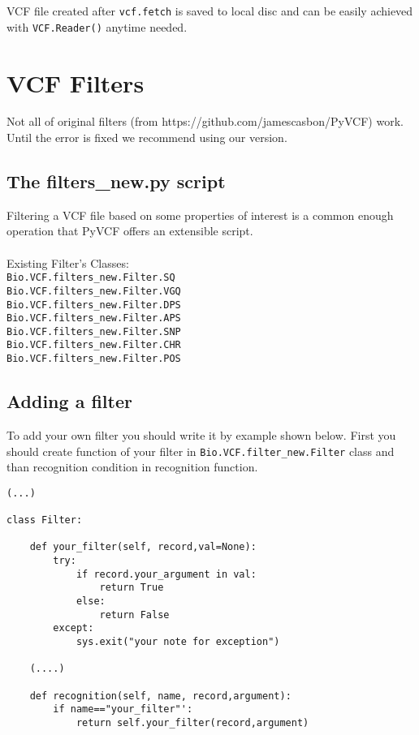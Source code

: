 \noindent VCF file created after \verb|vcf.fetch| is saved to local disc and can be easily achieved with \verb|VCF.Reader()| anytime needed.



\section{VCF Filters}
\noindent Not all of original filters (from https://github.com/jamescasbon/PyVCF) work. Until the error is  fixed we recommend using our version. 

\subsection{The filters\_new.py script}
\noindent Filtering a VCF file based on some properties of interest is a common enough operation that PyVCF offers an extensible script.\\
\\
\noindent Existing Filter's Classes:\\

\verb|Bio.VCF.filters_new.Filter.SQ| \\

\verb|Bio.VCF.filters_new.Filter.VGQ| \\

\verb|Bio.VCF.filters_new.Filter.DPS| \\

\verb|Bio.VCF.filters_new.Filter.APS| \\

\verb|Bio.VCF.filters_new.Filter.SNP| \\

\verb|Bio.VCF.filters_new.Filter.CHR| \\

\verb|Bio.VCF.filters_new.Filter.POS| \\



\subsection{Adding a filter}
\noindent To add your own filter you should write it by example shown below. First you should create function of your filter in \verb|Bio.VCF.filter_new.Filter| class and than recognition condition in recognition function.

\begin{verbatim}  
(...)

class Filter:

    def your_filter(self, record,val=None): 
        try:
            if record.your_argument in val:
                return True
            else:
                return False 
        except:
            sys.exit("your note for exception")

    (....)

    def recognition(self, name, record,argument):
        if name=="your_filter"':
            return self.your_filter(record,argument)

\end{verbatim}

